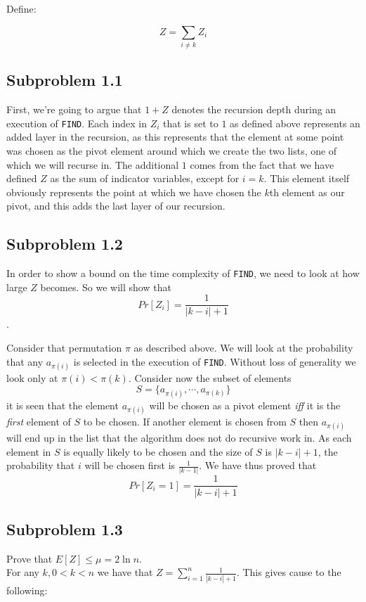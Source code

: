 \documentclass[article,a4paper,oneside]{memoir}
\newcommand{\+}[1]{\ensuremath{\boldsymbol{#1}}}
\begin{document}
Define:

$$Z=\sum_{i\neq k} Z_i$$

\subsection{Subproblem 1.1}
First, we're going to argue that $1+Z$ denotes the recursion depth during an execution of \texttt{FIND}. Each index in $Z_i$ that is set to $1$ as defined above represents an added layer in the recursion, as this represents that the element at some point was chosen as the pivot element around which we create the two lists, one of which we will recurse in. The additional $1$ comes from the fact that we have defined $Z$ as the sum of indicator variables, except for $i=k$. This element itself obviously represents the point at which we have chosen the $k$th element as our pivot, and this adds the last layer of our recursion.
\par

\subsection{Subproblem 1.2}
In order to show a bound on the time complexity of \texttt{FIND}, we need to look at how large $Z$ becomes. So we will show that $$Pr[Z_{i}]=\frac{1}{|k-i|+1}$$.
\par
Consider that permutation $\pi$ as described above. We will look at the probability that any $a_{\pi(i)}$ is selected in the execution of \texttt{FIND}. Without loss of generality we look only at $\pi(i) < \pi(k)$. Consider now the subset of elements $$S = \lbrace a_{\pi(i)},\cdots,a_{\pi(k)}\rbrace$$ it is seen that the element $a_{\pi(i)}$ will be chosen as a pivot element \emph{iff} it is the \emph{first} element of $S$ to be chosen. If another element is chosen from $S$ then $a_{\pi(i)}$ will end up in the list that the algorithm does not do recursive work in. As each element in $S$ is equally likely to be chosen and the size of $S$ is $|k - i| + 1$, the probability that $i$ will be chosen first is $\frac{1}{|k -1|}$. We have thus proved that $$Pr[Z_{i} = 1] = \frac{1}{|k-i|+1}$$

\subsection{Subproblem 1.3} 
Prove that $E[Z]\leq \mu = 2\ln n$.\\
For any $k, 0<k<n$ we have that $Z = \sum_{i=1}^{n} \frac{1}{|k-i|+1}$.
This gives cause to the following: 
\end{document}
